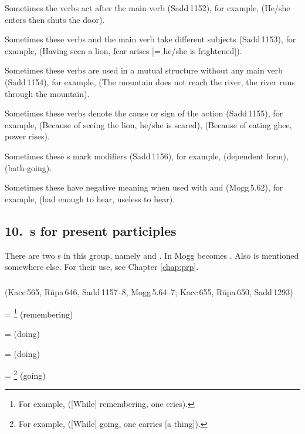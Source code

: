 Sometimes the verbs act after the main verb (Sadd\,1152), for example,  (He/she enters then shuts the door).

Sometimes these verbs and the main verb take different subjects (Sadd\,1153), for example,  (Having seen a lion, fear arises [= he/she is frightened]).

Sometimes these verbs are used in a mutual structure without any main verb (Sadd\,1154), for example,  (The mountain does not reach the river, the river runs through the mountain).

Sometimes these verbs denote the cause or sign of the action (Sadd\,1155), for example,  (Because of seeing the lion, he/she is scared),  (Because of eating ghee, power rises).

Sometimes these s mark modifiers (Sadd\,1156), for example,  (dependent form),  (bath-going).

Sometimes these have negative meaning when used with  and  (Mogg\,5.62), for example,  (had enough to hear, useless to hear).

\subsection*{10.\ s for present participles}\label{kita:group10}

There are two s in this group, namely  and . In Mogg  becomes . Also  is mentioned somewhere else. For their use, see Chapter \ref{chap:prp}.

\subparagraph*{} (Kacc\,565, R\=upa\,646, Sadd\,1157--8, Mogg\,5.64--7; Kacc\,655, R\=upa\,650, Sadd\,1293)\label{pacck10:maana}\label{pacck10:aana}\label{pacck10:anta}\label{pacck10:nta}

 = \footnote{For example,  ([While] remembering, one cries).} (remembering)\par
{} =  (doing)\par
{} =  (doing)\par
{} = \footnote{For example,  ([While] going, one carries [a thing]).} (going)\par

